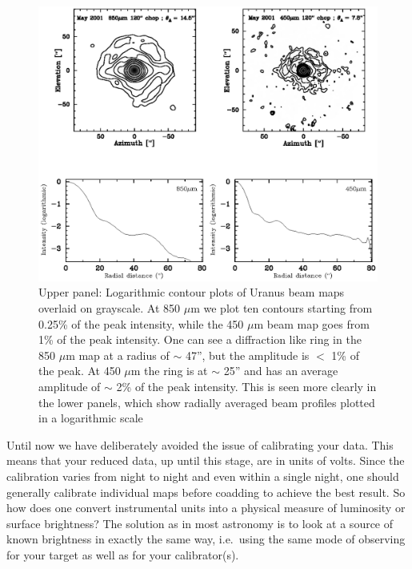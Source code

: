 \documentclass[twoside,11pt]{article}
\renewcommand{\_}{\texttt{\symbol{95}}}
\begin{document}
\begin{figure}
\begin{center}
\includegraphics[width=\textwidth]{sc11_fig11.eps}
\caption{Upper panel: Logarithmic contour plots of Uranus beam maps 
overlaid on grayscale.  At 850 $\mu$m we plot ten contours starting
from 0.25\% of the peak intensity, while the 450 $\mu$m beam map goes
from 1\% of the peak intensity.  One can see a diffraction like ring
in the 850 $\mu$m map at a radius of $\sim$ 47'', but the amplitude is
$<$ 1\% of the peak.  At 450 $\mu$m the ring is at $\sim$ 25'' and has
an average amplitude of $\sim$ 2\% of the peak intensity.  This is
seen more clearly in the lower panels, which show radially averaged
beam profiles plotted in a logarithmic scale}

\label{fig:beams}
\end{center}
\end{figure}



Until now we have deliberately avoided the issue of calibrating your
data. This means that your reduced data, up until this stage, are in
units of volts. Since the calibration varies from night to night and
even within a single night, one should generally calibrate individual
maps before coadding to achieve the best result. So how does one
convert instrumental units into a physical measure of luminosity or
surface brightness? The solution as in most astronomy is to look at a
source of known brightness in exactly the same way, i.e.\ using the
same mode of observing for your target as well as for your
calibrator(s).
\end{document}
